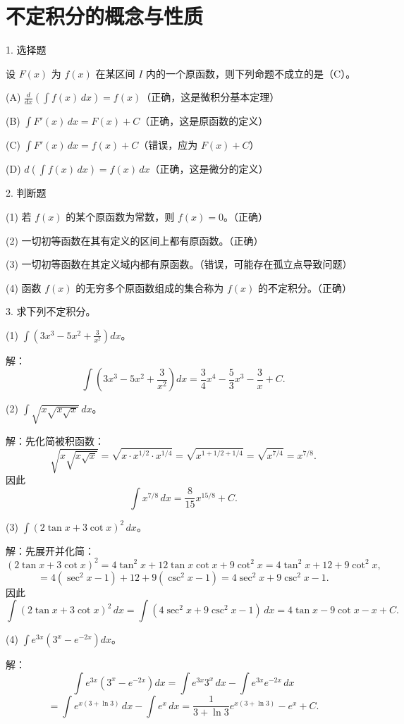 \section*{不定积分的概念与性质}

1. 选择题

设 \(F(x)\) 为 \(f(x)\) 在某区间 \(I\) 内的一个原函数，则下列命题不成立的是（C）。

(A) \(\frac{d}{dx}\left(\int f(x)\,dx\right)=f(x)\)（正确，这是微积分基本定理）

(B) \(\int F'(x)\,dx=F(x)+C\)（正确，这是原函数的定义）

(C) \(\int F'(x)\,dx=f(x)+C\)（错误，应为 \(F(x)+C\)）

(D) \(d\left(\int f(x)\,dx\right)=f(x)\,dx\)（正确，这是微分的定义）

2. 判断题

(1) 若 \(f(x)\) 的某个原函数为常数，则 \(f(x)=0\)。（正确）

(2) 一切初等函数在其有定义的区间上都有原函数。（正确）

(3) 一切初等函数在其定义域内都有原函数。（错误，可能存在孤立点导致问题）

(4) 函数 \(f(x)\) 的无穷多个原函数组成的集合称为 \(f(x)\) 的不定积分。（正确）

3. 求下列不定积分。

(1) \(\int\left(3x^{3}-5x^{2}+\frac{3}{x^{2}}\right)dx\)。

解：
\[ \int\left(3x^{3}-5x^{2}+\frac{3}{x^{2}}\right)dx=\frac{3}{4}x^{4}-\frac{5}{3}x^{3}-\frac{3}{x}+C. \]

(2) \(\int\sqrt{x\sqrt{x\sqrt{x}}}\,dx\)。

解：先化简被积函数：
\[ \sqrt{x\sqrt{x\sqrt{x}}}=\sqrt{x\cdot x^{1/2}\cdot x^{1/4}}=\sqrt{x^{1+1/2+1/4}}=\sqrt{x^{7/4}}=x^{7/8}. \]
因此
\[ \int x^{7/8}\,dx=\frac{8}{15}x^{15/8}+C. \]

(3) \(\int(2\tan x+3\cot x)^{2}\,dx\)。

解：先展开并化简：
\[ (2\tan x+3\cot x)^{2}=4\tan^{2}x+12\tan x\cot x+9\cot^{2}x=4\tan^{2}x+12+9\cot^{2}x, \]
\[ =4(\sec^{2}x-1)+12+9(\csc^{2}x-1)=4\sec^{2}x+9\csc^{2}x-1. \]
因此
\[ \int(2\tan x+3\cot x)^{2}\,dx=\int(4\sec^{2}x+9\csc^{2}x-1)\,dx=4\tan x-9\cot x-x+C. \]

(4) \(\int e^{3x}\left(3^{x}-e^{-2x}\right)dx\)。

解：
\[ \int e^{3x}\left(3^{x}-e^{-2x}\right)dx=\int e^{3x}3^{x}\,dx-\int e^{3x}e^{-2x}\,dx \]
\[ =\int e^{x(3+\ln 3)}\,dx-\int e^{x}\,dx=\frac{1}{3+\ln 3}e^{x(3+\ln 3)}-e^{x}+C. \]

